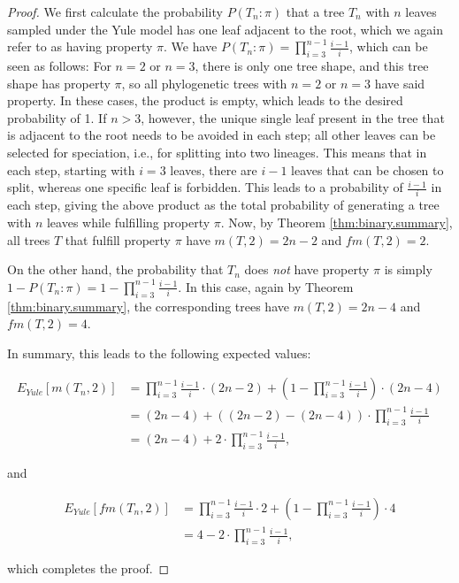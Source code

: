 \documentclass{amsart}
\theoremstyle{definition}
\begin{document}
\begin{proof} We first calculate the probability $P(T_n:\pi)$ that a tree $T_n$ with $n$ leaves sampled under the Yule model has one leaf adjacent to the root, which we again refer to as having property $\pi$. We have $P(T_n:\pi)=\prod\limits_{i=3}^{n-1}\frac{i-1}{i}$, which can be seen as follows: For $n=2$ or $n=3$, there is only one tree shape, and this tree shape has property $\pi$, so all phylogenetic trees with $n=2$ or $n=3$ have said property. In these cases, the product is empty, which leads to the desired probability of 1. If $n>3$, however, the unique single leaf present in the tree that is adjacent to the root needs to be avoided in each step; all other leaves can be selected for speciation, i.e., for splitting into two lineages. This means that in each step, starting with $i=3$ leaves, there are $i-1$ leaves that can be chosen to split, whereas one specific leaf is forbidden. This leads to a probability of $\frac{i-1}{i}$ in each step, giving the above product as the total probability of generating a tree with $n$ leaves while fulfilling property $\pi$. Now, by Theorem \ref{thm:binary.summary}, all trees $T$ that fulfill property $\pi$ have $m(T,2)=2n-2$ and $fm(T,2)=2$. 

On the other hand, the probability that $T_n$ does \emph{not} have property $\pi$ is simply $1-P(T_n : \pi)=1-\prod\limits_{i=3}^{n-1}\frac{i-1}{i}$. In this case, again by Theorem \ref{thm:binary.summary}, the corresponding trees have $m(T,2)=2n-4$ and $fm(T,2)=4$.

In summary, this leads to the following expected values: 

\begin{align*}
  E_{Yule}[m(T_n,2)]&=  \prod\limits_{i=3}^{n-1}\frac{i-1}{i} \cdot (2n-2) +  \left(1-\prod\limits_{i=3}^{n-1}\frac{i-1}{i}\right) \cdot (2n-4)\\
  &=(2n-4)+((2n-2)-(2n-4))\cdot  \prod\limits_{i=3}^{n-1}\frac{i-1}{i}\\
  &=(2n-4)+2\cdot  \prod\limits_{i=3}^{n-1}\frac{i-1}{i},
\end{align*}

and

\begin{align*}
  E_{Yule}[fm(T_n,2)]&=  \prod\limits_{i=3}^{n-1}\frac{i-1}{i} \cdot 2 +  \left(1-\prod\limits_{i=3}^{n-1}\frac{i-1}{i}\right) \cdot 4\\
  &=4-2\cdot  \prod\limits_{i=3}^{n-1}\frac{i-1}{i},
\end{align*}

which completes the proof.



\end{proof}
\end{document}
